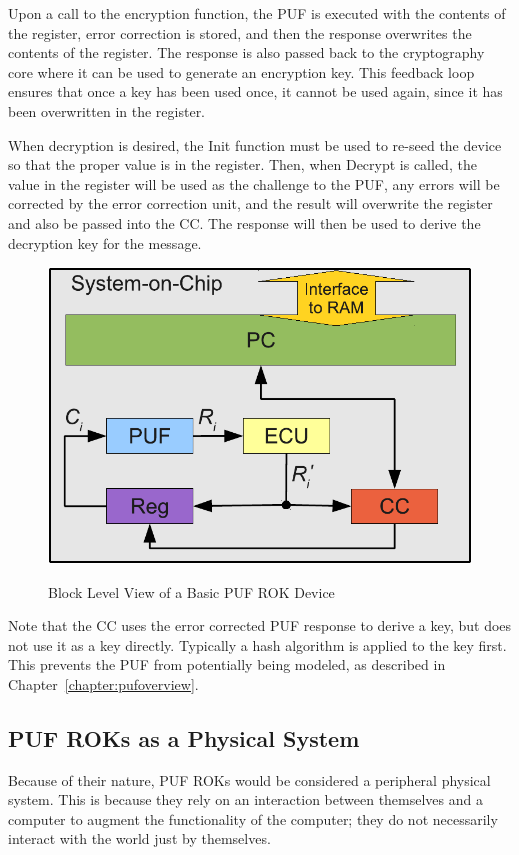 Upon a call to the encryption function, the PUF is executed with the contents of the register, error correction is stored,
and then the response overwrites the contents of the register. The response is also passed back to the cryptography
core where it can be used to generate an encryption key. This feedback loop ensures that once a key has been used
once, it cannot be used again, since it has been overwritten in the register.

When decryption is desired, the Init function must be used to re-seed the device so that the proper value is in the
register. Then, when Decrypt is called, the value in the register will be used as the challenge to the PUF, any errors
will be corrected by the error correction unit, and the result will overwrite the register and also be passed into the
CC. The response will then be used to derive the decryption key for the message.

\begin{figure}[!ht]
\includegraphics[width=500px]{images/rok_soc.pdf}
\label{fig:basicrok}
\caption{Block Level View of a Basic PUF ROK Device}
\end{figure}
\FloatBarrier

Note that the CC uses the error corrected PUF response to derive a key, but does not use it as a key directly.	Typically
a hash algorithm is applied to the key first. This prevents the PUF from potentially being modeled, as described in
Chapter~\ref{chapter:pufoverview}.

\subsection{PUF ROKs as a Physical System}
Because of their nature, PUF ROKs would be considered a peripheral physical system. This is because they rely
on an interaction between themselves and a computer to augment the functionality of the computer; 
they do not necessarily interact with the world just by themselves.


